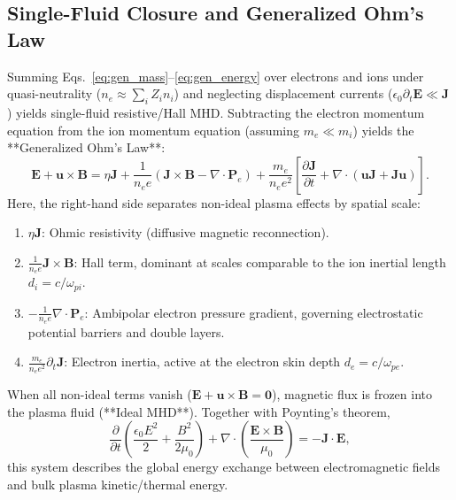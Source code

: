 \documentclass[11pt,a4paper]{article}
\newcommand{\vect}[1]{\bm{#1}}
\newcommand{\pderiv}[2]{\frac{\partial #1}{\partial #2}}
\begin{document}
\subsection{Single-Fluid Closure and Generalized Ohm's Law}
Summing Eqs.~\eqref{eq:gen_mass}--\eqref{eq:gen_energy} over electrons and ions under quasi-neutrality ($n_e \approx \sum_i Z_i n_i$) and neglecting displacement currents ($\epsilon_0 \partial_t \vect{E} \ll \vect{J}$) yields single-fluid resistive/Hall MHD. Subtracting the electron momentum equation from the ion momentum equation (assuming $m_e \ll m_i$) yields the **Generalized Ohm's Law**:
\begin{equation}
    \vect{E} + \vect{u} \times \vect{B} = \eta \vect{J} + \frac{1}{n_e e} \left( \vect{J} \times \vect{B} - \nabla \cdot \mathbf{P}_e \right) + \frac{m_e}{n_e e^2} \left[ \pderiv{\vect{J}}{t} + \nabla \cdot \left( \vect{u}\vect{J} + \vect{J}\vect{u} \right) \right].
    \label{eq:gen_ohm}
\end{equation}
Here, the right-hand side separates non-ideal plasma effects by spatial scale:
\begin{enumerate}
    \item $\eta \vect{J}$: Ohmic resistivity (diffusive magnetic reconnection).
    \item $\frac{1}{n_e e} \vect{J} \times \vect{B}$: Hall term, dominant at scales comparable to the ion inertial length $d_i = c/\omega_{pi}$.
    \item $-\frac{1}{n_e e} \nabla \cdot \mathbf{P}_e$: Ambipolar electron pressure gradient, governing electrostatic potential barriers and double layers.
    \item $\frac{m_e}{n_e e^2} \partial_t \vect{J}$: Electron inertia, active at the electron skin depth $d_e = c/\omega_{pe}$.
\end{enumerate}

When all non-ideal terms vanish ($\vect{E} + \vect{u} \times \vect{B} = \vect{0}$), magnetic flux is frozen into the plasma fluid (**Ideal MHD**). Together with Poynting's theorem,
\begin{equation}
    \pderiv{}{t} \left( \frac{\epsilon_0 E^2}{2} + \frac{B^2}{2\mu_0} \right) + \nabla \cdot \left( \frac{\vect{E} \times \vect{B}}{\mu_0} \right) = -\vect{J} \cdot \vect{E},
    \label{eq:poynting}
\end{equation}
this system describes the global energy exchange between electromagnetic fields and bulk plasma kinetic/thermal energy.
\end{document}
